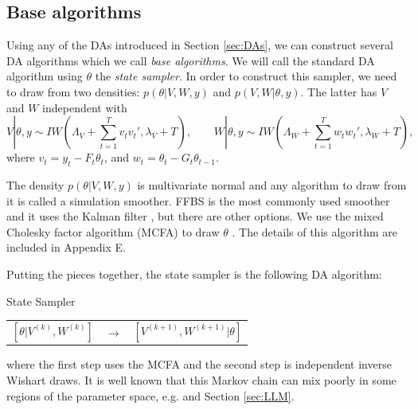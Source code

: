 \documentclass[12pt]{article}
\begin{document}
\subsection{Base algorithms}\label{sec:Algs:base}
Using any of the DAs introduced in Section \ref{sec:DAs}, we can construct several DA algorithms which we call {\it base algorithms}. We will call the standard DA algorithm using $\theta$ the {\it state sampler}. In order to construct this sampler, we need to draw from two densities: $p(\theta|V,W,y)$ and $p(V,W|\theta,y)$. The latter has $V$ and $W$ independent with \vspace{-.1cm}
\[
  V|\theta,y \sim IW\left(\Lambda_V + \sum_{t=1}^Tv_tv_t',\lambda_V + T\right), \qquad
  W|\theta,y \sim IW\left(\Lambda_W + \sum_{t=1}^Tw_tw_t',\lambda_{W} + T\right), %
\]
where $v_t = y_t - F_t\theta_t$, and $w_t = \theta_t - G_t\theta_{t-1}$. 

The density $p(\theta|V,W,y)$ is multivariate normal and any algorithm to draw from it is called a simulation smoother. FFBS is the most commonly used smoother and it uses the Kalman filter \citep{fruhwirth1994data,carter1994gibbs}, but there are other options.
We use the mixed Cholesky factor algorithm (MCFA) to draw $\theta$ \citep{mccausland2011simulation,kastner2013ancillarity}. The details of this algorithm are included in Appendix E.

Putting the pieces together, the state sampler is the following DA algorithm:
\begin{alg*}[State]State Sampler\label{alg:DLMstate}
{\small \vspace{-.5cm}
\begin{center}
\begin{tabular}{lll}
$[\theta|V^{(k)},W^{(k)}]$ & $\to$ & $[V^{(k+1)},W^{(k+1)}|\theta]$
\end{tabular}
\end{center}
}
\end{alg*}
\noindent where the first step uses the MCFA and the second step is independent inverse Wishart draws. It is well known that this Markov chain can mix poorly in some regions of the parameter space, e.g. \citet{fruhwirth2004efficient} and Section \ref{sec:LLM}.
\end{document}
